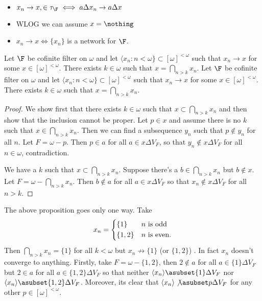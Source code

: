 \documentclass{article}
\begin{document}
\begin{itemize}
    \item \(x_n \to x, \in \tau_{\F} \iff a\Delta x_n \to a\Delta x\)
    \item WLOG we can assume \(x = \nothing\)
    \item \(x_n \to x \iff \{x_n\}\) is a network for \(\F\).
\end{itemize}
\begin{prop}
    Let \(\F\) be cofinite filter on \(\omega\) and let \(\langle x_n :n < \omega\} \subset [\omega]^{<\omega}\) such that \(x_n \to x\) for some \(x \in [\omega]^{<\omega}\). There exists \(k \in \omega\) such that \(x = \bigcap_{n > k}x_n\).
    Let \(\F\) be cofinite filter on \(\omega\) and let \(\langle x_n :n < \omega\} \subset [\omega]^{<\omega}\) such that \(x_n \to x\) for some \(x \in [\omega]^{<\omega}\). There exists \(k \in \omega\) such that \(x = \bigcap_{n > k}x_n\).
\end{prop}
\begin{proof}
    We show first that there exists \(k \in \omega\) such that \(x \subset \bigcap_{n > k}x_n\) and then show that the inclusion cannot be proper. Let \(p \in x\) and assume there is no \(k\) such that \(x \in  \bigcap_{n > k}x_n\). Then we can find a subsequence \(y_n\) such that \(p \not \in y_n\) for all \(n\). Let \(F = \omega- p\). Then \(p \in a\) for all \(a \in x\Delta V_F\), so that \(y_n \not \in x\Delta V_F\) for all \(n \in \omega\), contradiction. 

    We have a \(k\) such that \(x \subset \bigcap_{n > k}x_n\). Suppose there's a \(b \in \bigcap_{n > k}x_n\) but \(b \not \in x\). Let \(F = \omega -\bigcap_{n > k}x_n\). Then \(b \not \in a\) for all \(a \in x\Delta V_F\) so that \(x_n \not \in x\Delta V_F\) for all \(n > k\).
\end{proof}
\begin{rem}
    The above proposition goes only one way. Take 
    \[
        x_n = \begin{dcases}
        \{1\} &  n \text{ is odd}\\
        \{1, 2\} & n \text{ is even.}
        \end{dcases}
    \]
    Then \(\bigcap_{n > k}x_n = \{1\}\) for all \(k < \omega\) but \(x_n \not \to \{1\}\) (or \(\{1, 2\}\)) . In fact \(x_n\) doesn't converge to anything. Firstly, take \(F = \omega - \{1, 2\}\), then \(2 \not \in a\) for all \(a \in \{1\}\Delta V_F\) but \(2 \in a\) for all \(a \in \{1, 2\}\Delta V_F\) so that neither \(\langle x_n \rangle \asubset \{1\}\Delta V_F\) nor \(\langle x_n \rangle \asubset \{1,2\}\Delta V_F\). Moreover, its clear that \(\langle x_n \rangle \not\asubset p\Delta V_F\) for any other \(p \in [\omega]^{<\omega}\).
\end{rem}
\end{document}
